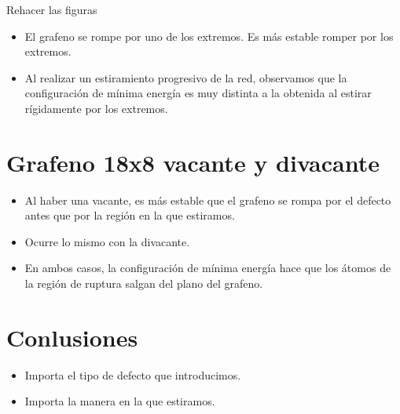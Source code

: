 Rehacer las figuras

\begin{itemize}
    \item El grafeno se rompe por uno de los extremos. Es más estable romper por los extremos.
    \item Al realizar un estiramiento progresivo de la red, observamos que la configuración de mínima energía es muy distinta a la obtenida al estirar rígidamente por los extremos. 
\end{itemize}

\section{Grafeno 18x8 vacante y divacante}

\begin{itemize}
    \item Al haber una vacante, es más estable que el grafeno se rompa por el defecto antes que por la región en la que estiramos. 
    \item Ocurre lo mismo con la divacante. 
    \item En ambos casos, la configuración de mínima energía hace que los átomos de la región de ruptura salgan del plano del grafeno. 
\end{itemize}


\section{Conlusiones}

\begin{itemize}
    \item Importa el tipo de defecto que introducimos.
    \item Importa la manera en la que estiramos. 
\end{itemize}



